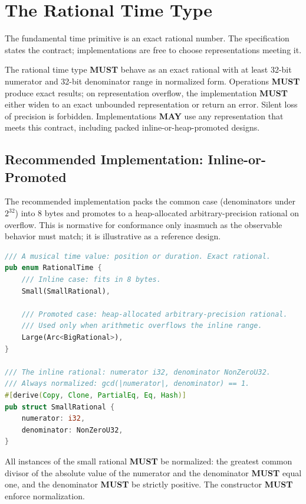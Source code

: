 \documentclass[11pt,letterpaper]{report}
\newcounter{requirement}[chapter]
\newcommand{\MUST}{\textbf{MUST}}
\newcommand{\MAY}{\textbf{MAY}}
\begin{document}
\section{The Rational Time Type}
\label{sec:time:rational}

The fundamental time primitive is an exact rational number. The
specification states the contract; implementations are free to choose
representations meeting it.

\begin{requirement}
  \label{req:time:exact-rational-time}
  The rational time type \MUST{} behave as an exact rational with at
  least 32-bit numerator and 32-bit denominator range in normalized
  form. Operations \MUST{} produce exact results; on representation
  overflow, the implementation \MUST{} either widen to an exact
  unbounded representation or return an error. Silent loss of precision
  is forbidden. Implementations \MAY{} use any representation that
  meets this contract, including packed inline-or-heap-promoted designs.
\end{requirement}

\subsection{Recommended Implementation: Inline-or-Promoted}
\label{sec:time:impl}

The recommended implementation packs the common case (denominators
under $2^{32}$) into 8 bytes and promotes to a heap-allocated
arbitrary-precision rational on overflow. This is normative for
conformance only inasmuch as the observable behavior must match;
it is illustrative as a reference design.

\begin{lstlisting}[language=Rust]
/// A musical time value: position or duration. Exact rational.
pub enum RationalTime {
    /// Inline case: fits in 8 bytes.
    Small(SmallRational),

    /// Promoted case: heap-allocated arbitrary-precision rational.
    /// Used only when arithmetic overflows the inline range.
    Large(Arc<BigRational>),
}

/// The inline rational: numerator i32, denominator NonZeroU32.
/// Always normalized: gcd(|numerator|, denominator) == 1.
#[derive(Copy, Clone, PartialEq, Eq, Hash)]
pub struct SmallRational {
    numerator: i32,
    denominator: NonZeroU32,
}
\end{lstlisting}

\begin{requirement}
  \label{req:time:rational-normalization}
  All instances of the small rational \MUST{} be normalized: the
  greatest common divisor of the absolute value of the numerator and
  the denominator \MUST{} equal one, and the denominator \MUST{} be
  strictly positive. The constructor \MUST{} enforce normalization.
\end{requirement}
\end{document}
